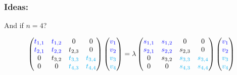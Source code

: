 \documentclass{beamer}
\theoremstyle{definition} \newtheorem{de}{Def}
\theoremstyle{remark} \newtheorem{os}[de]{Oss}
\theoremstyle{plain} \newtheorem{te}[de]{Teo}
\theoremstyle{plain} \newtheorem{co}[de]{Cor}
\theoremstyle{plain} \newtheorem{pr}[de]{Prop}
\theoremstyle{plain} \newtheorem{lem}[de]{Lemm}
\theoremstyle{remark} \newtheorem{rem}[de]{Remark}
\begin{document}
\begin{frame}
  \frametitle{Ideas:}

  And if $n=4$?
  
  \begin{equation*}
    \begin{pmatrix}
      \textcolor{blue}{t_{1,1}} & \textcolor{blue}{t_{1,2}} & 0 & 0\\
      \textcolor{blue}{t_{2,1}} & \textcolor{blue}{t_{2,2}} & t_{2,3} & 0\\
      0 & t_{3,2} & \textcolor{cyan}{t_{3,3}} & \textcolor{cyan}{t_{3,4}}\\
      0 & 0 & \textcolor{cyan}{t_{4,3}} & \textcolor{cyan}{t_{4,4}}
    \end{pmatrix} \begin{pmatrix} 
      \textcolor{blue}{v_1} \\ 
      \textcolor{blue}{v_2} \\
      \textcolor{cyan}{v_3} \\
      \textcolor{cyan}{v_4}
    \end{pmatrix} = \lambda \begin{pmatrix}
      \textcolor{blue}{s_{1,1}} & \textcolor{blue}{s_{1,2}} & 0 & 0\\
      \textcolor{blue}{s_{2,1}} & \textcolor{blue}{s_{2,2}} & s_{2,3} & 0\\
      0 & s_{3,2} & \textcolor{cyan}{s_{3,3}} & \textcolor{cyan}{s_{3,4}}\\
      0 & 0 & \textcolor{cyan}{s_{4,3}} & \textcolor{cyan}{s_{4,4}}
    \end{pmatrix} \begin{pmatrix}
      \textcolor{blue}{v_1} \\ 
      \textcolor{blue}{v_2} \\
      \textcolor{cyan}{v_3} \\
      \textcolor{cyan}{v_4}
    \end{pmatrix}
  \end{equation*}

\end{frame}
\end{document}
